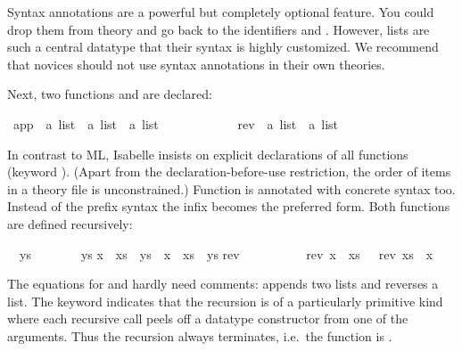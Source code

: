 \begin{isabellebody}
\begin{isamarkuptext}
\begin{warn}
  Syntax annotations are a powerful but completely optional feature. You
  could drop them from theory  and go back to the identifiers
   and . However, lists are such a
  central datatype
  that their syntax is highly customized. We recommend that novices should
  not use syntax annotations in their own theories.
\end{warn}
Next, two functions  and  are declared:%
\end{isamarkuptext}%
\ app\ {\isacharcolon}{\isacharcolon}\ {\isachardoublequote}{\isacharprime}a\ list\ {\isasymRightarrow}\ {\isacharprime}a\ list\ {\isasymRightarrow}\ {\isacharprime}a\ list{\isachardoublequote}\ \ \ {\isacharparenleft}\ {\isachardoublequote}{\isacharat}{\isachardoublequote}\ \isanewline
\ \ \ \ \ \ \ rev\ {\isacharcolon}{\isacharcolon}\ {\isachardoublequote}{\isacharprime}a\ list\ {\isasymRightarrow}\ {\isacharprime}a\ list{\isachardoublequote}%
\begin{isamarkuptext}%
\noindent
In contrast to ML, Isabelle insists on explicit declarations of all functions
(keyword ).  (Apart from the declaration-before-use
restriction, the order of items in a theory file is unconstrained.) Function
 is annotated with concrete syntax too. Instead of the prefix
syntax  the infix
 becomes the preferred
form. Both functions are defined recursively:%
\end{isamarkuptext}%
\isanewline
{\isachardoublequote}{\isacharbrackleft}{\isacharbrackright}\ {\isacharat}\ ys\ \ \ \ \ \ \ {\isacharequal}\ ys{\isachardoublequote}\isanewline
{\isachardoublequote}{\isacharparenleft}x\ {\isacharhash}\ xs{\isacharparenright}\ {\isacharat}\ ys\ {\isacharequal}\ x\ {\isacharhash}\ {\isacharparenleft}xs\ {\isacharat}\ ys{\isacharparenright}{\isachardoublequote}\isanewline
\isanewline
{}\isanewline
{\isachardoublequote}rev\ {\isacharbrackleft}{\isacharbrackright}\ \ \ \ \ \ \ \ {\isacharequal}\ {\isacharbrackleft}{\isacharbrackright}{\isachardoublequote}\isanewline
{\isachardoublequote}rev\ {\isacharparenleft}x\ {\isacharhash}\ xs{\isacharparenright}\ \ {\isacharequal}\ {\isacharparenleft}rev\ xs{\isacharparenright}\ {\isacharat}\ {\isacharparenleft}x\ {\isacharhash}\ {\isacharbrackleft}{\isacharbrackright}{\isacharparenright}{\isachardoublequote}%
\begin{isamarkuptext}%
\noindent
The equations for  and  hardly need comments:
 appends two lists and  reverses a list.  The keyword
 indicates that the recursion is of a
particularly primitive kind where each recursive call peels off a datatype
constructor from one of the arguments.  Thus the
recursion always terminates, i.e.\ the function is .


\end{isamarkuptext}
\end{isabellebody}
